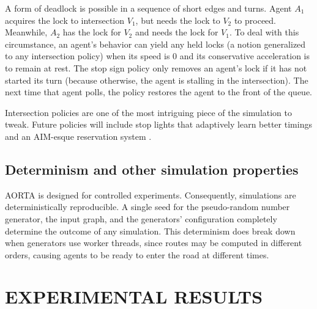 \documentclass[letterpaper, 10 pt, conference]{ieeeconf}  %
\begin{document}
A form of deadlock is possible in a sequence of short edges and turns. Agent
$A_1$ acquires the lock to intersection $V_1$, but needs the lock to $V_2$ to
proceed. Meanwhile, $A_2$ has the lock for $V_2$ and needs the lock for $V_1$.
To deal with this circumstance, an agent's behavior can yield any held locks (a
notion generalized to any intersection policy) when its speed is $0$ and its
conservative acceleration is to remain at rest. The stop sign policy only
removes an agent's lock if it has not started its turn (because otherwise, the
agent is stalling in the intersection). The next time that agent polls, the
policy restores the agent to the front of the queue.



Intersection policies are one of the most intriguing piece of the simulation to
tweak. Future policies will include stop lights that adaptively learn better
timings and an AIM-esque reservation system \cite{JAIR08-dresner}.

\subsection{Determinism and other simulation properties}

AORTA is designed for controlled experiments. Consequently, simulations are
deterministically reproducible. A single seed for the pseudo-random number
generator, the input graph, and the generators' configuration completely
determine the outcome of any simulation. This determinism does break down when
generators use worker threads, since routes may be computed in different orders,
causing agents to be ready to enter the road at different times.





\section{EXPERIMENTAL RESULTS}
\end{document}
